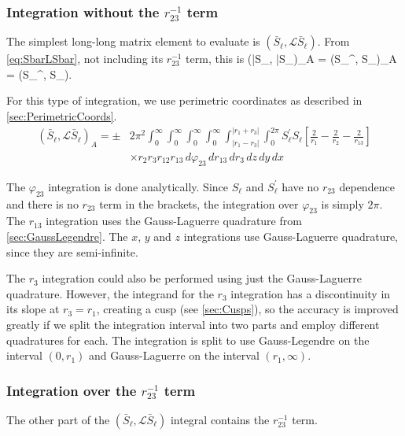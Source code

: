 \documentclass[Dissertation.tex]{subfiles}
\begin{document}
\subsubsection{Integration without the \texorpdfstring{$r_{23}^{-1}$} {1/r23} term}
\label{sec:LongLongNoR23}
The simplest long-long matrix element to evaluate is
$(\bar{S}_\ell,\mathcal{L} \bar{S}_\ell)$. From \cref{eq:SbarLSbar}, not
including its $r_{23}^{-1}$ term, this is
\beq
(\bar{S}_\ell, \bar{S}_\ell)_A = \pm \left(S_\ell^\prime, S_\ell\right)_A = \pm \left(S_\ell^\prime,  S_\ell\right).
\eeq

For this type of integration, we use perimetric coordinates as described in
\cref{sec:PerimetricCoords}.
\begin{align}
\label{eq:SBarSBarInt}
(\bar{S}_\ell,\mathcal{L} \bar{S}_\ell)_A = \pm &2\pi^2 \int_0^\infty \int_0^\infty \int_0^\infty \int_0^\infty \int_{|r_1 - r_3|}^{|r_1 + r_3|} \int_0^{2\pi}  S_\ell^\prime S_\ell \left[ \frac{2}{r_1} - \frac{2}{r_2} - \frac{2}{r_{13}}\right] \\
&\times r_2 r_3 r_{12} r_{13}\, d\varphi_{23}\, dr_{13}\, dr_3\, dz\, dy\, dx
\end{align}

The $\varphi_{23}$ integration is done analytically. Since $S_\ell$ and
$S_\ell^\prime$ have no $r_{23}$ dependence and there is no $r_{23}$ term in
the brackets, the integration over $\varphi_{23}$ is simply $2\pi$. The
$r_{13}$ integration uses the Gauss-Laguerre quadrature from
\cref{sec:GaussLegendre}. The $x$, $y$ and $z$ integrations use Gauss-Laguerre 
quadrature, since they are semi-infinite.

The $r_3$ integration could also be performed using just the Gauss-Laguerre 
quadrature. However, the integrand for the $r_3$ integration has a 
discontinuity in its slope at $r_3=r_1$, creating a cusp
(see \cref{sec:Cusps}), so the accuracy is improved greatly if we split the
integration interval into two parts and employ different quadratures for each.
The integration is split to use Gauss-Legendre on the interval $(0,r_1)$ and
Gauss-Laguerre on the interval $(r_1,\infty)$.

\subsubsection{Integration over the \texorpdfstring{$r_{23}^{-1}$} {1/r23} term}
\label{sec:LongLongR23}
The other part of the $(\bar{S}_\ell,\mathcal{L} \bar{S}_\ell)$ integral
contains the $r_{23}^{-1}$ term.
\end{document}
